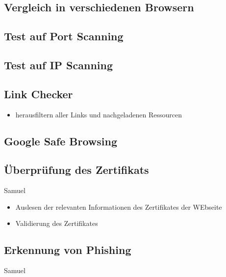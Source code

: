 \subsection{Vergleich in verschiedenen Browsern}

\subsection{Test auf Port Scanning}

\subsection{Test auf IP Scanning}

\subsection{Link Checker}
\begin{itemize}
  \item herausfiltern aller Links und nachgeladenen Ressourcen
\end{itemize}

\subsection{Google Safe Browsing}

\subsection{Überprüfung des Zertifikats}

\todo Samuel

\begin{itemize}
  \item Auslesen der relevanten Informationen des Zertifikates der WEbseite
  \item Validierung des Zertifikates
\end{itemize}

\subsection{Erkennung von Phishing}

\todo Samuel

